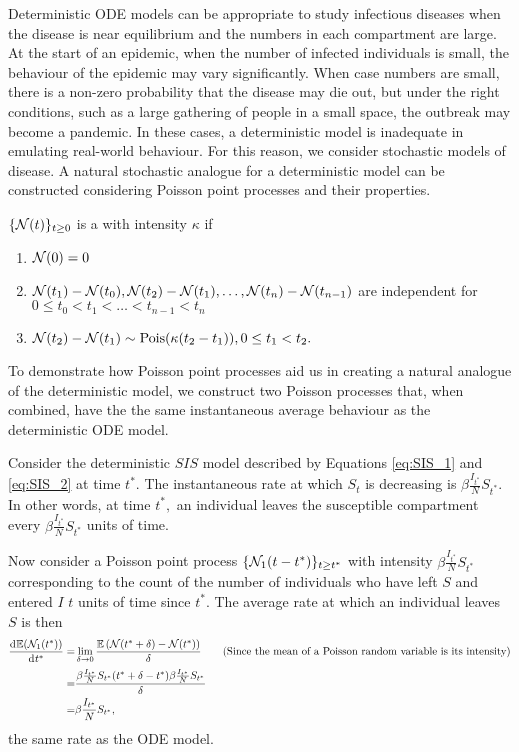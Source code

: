 Deterministic ODE models can be appropriate to study infectious diseases
when the disease is near equilibrium and the numbers
in each compartment are large. At the start of an epidemic, when the
number of infected individuals is small, the behaviour of the epidemic may
vary significantly. When case numbers are small, there is a non-zero
probability that the disease may die out, but under the right conditions,
such as a large gathering of people
in a small space, the outbreak may become a pandemic.
In these cases, a deterministic model is inadequate in emulating real-world
behaviour. For this reason, we consider stochastic models of disease.
A natural stochastic analogue for a deterministic
model can be constructed considering
Poisson point processes and their properties.

\begin{definition}\label{def:ppp}
    $\{\mathcal{N}(t)\}_{t\geq0}$ is a  with 
    intensity $\kappa$ if \begin{enumerate}
        \item $\mathcal{N}(0) = 0$
        \item $\mathcal{N}(t_1) - \mathcal{N}(t_0), 
        \mathcal{N}(t_2) - \mathcal{N}(t_1), \dots, \mathcal{N}(t_n) - \mathcal{N}(t_{n-1})$ 
        are independent for $0 \leq t_0 < t_1 < \dots < t_{n-1} < t_n $
        \item $\mathcal{N}(t_2) - \mathcal{N}(t_1) 
        \sim \operatorname{Pois}(\kappa(t_2 - t_1)), 0 \leq t_1 < t_2.$
    \end{enumerate}
\end{definition}

To demonstrate how Poisson point processes aid us in creating a natural
analogue of the deterministic model, we construct two Poisson processes
that, when combined, have the
the same instantaneous average behaviour as the
deterministic ODE model.

Consider the deterministic $SIS$ model described by Equations
\ref{eq:SIS_1} and \ref{eq:SIS_2} at time $t^*.$ The
instantaneous rate at which $S_t$ is decreasing is
$\beta \frac{I_{t^*}}{N} S_{t^*}.$ In other words, at time $t^*,$
an individual leaves
the susceptible compartment every $\beta \frac{I_{t^*}}{N} S_{t^*}$
units of time.

Now consider a Poisson point process $\{\mathcal{N}_1(t - t^*)\}_{t\geq t^*}$ with
intensity $\beta \frac{I_{t^*}}{N} S_{t^*}$ corresponding to the count of the
number of individuals who have left $S$ and entered $I$ $t$ units of time
since $t^*.$ The average rate at which an individual leaves $S$ is then
\begin{align*}
    \frac{\diff \E(\N_1(t^*))}{\diff t^*}
    = & \lim_{\delta \to 0}\frac{\E{(\N(t^* + \delta) - \N(t^*))}}{\delta}
    \tag{Since the mean of a Poisson random variable is its intensity}     \\
    = & \frac{
        \beta \frac{I_{t^*}}{N} S_{t^*}
        (t^* + \delta - t^*)
        \beta \frac{I_{t^*}}{N} S_{t^*}
    }{
        \delta
    }                                                                      \\
    = & \beta \frac{I_{t^*}}{N} S_{t^*},
\end{align*}
the same rate as the ODE model.

